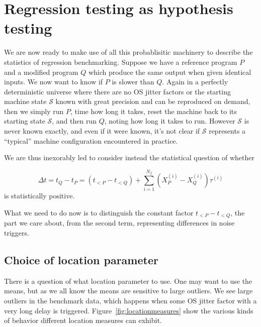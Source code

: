 \documentclass[conference]{IEEEtran}
\begin{document}
\section{Regression testing as hypothesis testing}

We are now ready to make use of all this probablisitic machinery to describe the statistics of regression benchmarking. Suppose we have a reference program $P$ and a modified program $Q$ which produce the same output when given identical inputs. We now want to know if $P$ is slower than $Q$. Again in a perfectly deterministic universe where there are no OS jitter factors or the starting machine state $\mathcal S$ known with great precision and can be reproduced on demand, then we simply run $P$, time how long it takes, reset the machine back to its starting state $\mathcal S$, and then run $Q$, noting how long it takes to run. However $\mathcal S$ is never known exactly, and even if it were known, it's not clear if
$\mathcal S$ represents a ``typical'' machine configuration encountered in practice.

We are thus inexorably led to consider instead the statistical question of whether

\begin{equation}
\Delta t = t_Q - t_P
= (t_{<P} - t_{<Q}) + \sum_{i=1}^{N_f} (X^{(i)}_P - X^{(i)}_Q) \tau^{(i)}
\end{equation}
%
is statistically positive.

What we need to do now is to distinguish the constant factor $t_{<P} - t_{<Q}$, the part we care about, from the second term, representing differences in noise triggers.



\subsection{Choice of location parameter}

There is a question of what location parameter to use.
One may want to use the means, but as we all know the means are sensitive to large outliers. We see large outliers in the benchmark data, which happens when some OS jitter factor with a very long delay is triggered.
Figure~\ref{fig:locationmeasures} show the various kinds of behavior different location measures can exhibit.
\end{document}
